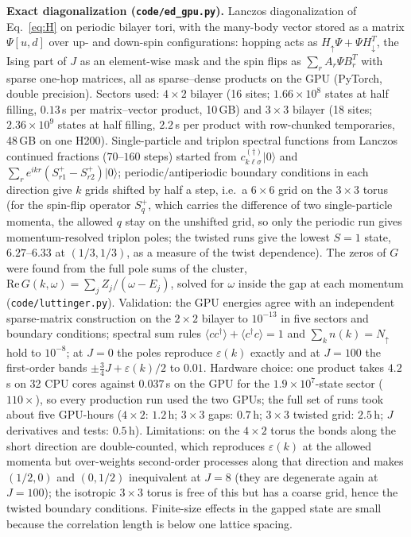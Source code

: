 \documentclass[11pt]{article}
\begin{document}
\textbf{Exact diagonalization (\texttt{code/ed\_gpu.py}).} Lanczos diagonalization of Eq.~\eqref{eq:H} on periodic bilayer tori, with the many-body vector stored as a matrix $\Psi[u,d]$ over up- and down-spin configurations: hopping acts as $H_\uparrow\Psi+\Psi H_\downarrow^{T}$, the Ising part of $J$ as an element-wise mask and the spin flips as $\sum_r A_r\Psi B_r^{T}$ with sparse one-hop matrices, all as sparse--dense products on the GPU (PyTorch, double precision). Sectors used: $4\times2$ bilayer (16 sites; $1.66\times10^8$ states at half filling, $0.13$\,s per matrix--vector product, 10\,GB) and $3\times3$ bilayer (18 sites; $2.36\times10^9$ states at half filling, $2.2$\,s per product with row-chunked temporaries, 48\,GB on one H200). Single-particle and triplon spectral functions from Lanczos continued fractions ($70$--$160$ steps) started from $c^{(\dagger)}_{k\ell\sigma}|0\rangle$ and $\sum_r e^{ikr}(S^+_{r1}-S^+_{r2})|0\rangle$; periodic/antiperiodic boundary conditions in each direction give $k$ grids shifted by half a step, i.e.\ a $6\times6$ grid on the $3\times3$ torus (for the spin-flip operator $S^+_q$, which carries the difference of two single-particle momenta, the allowed $q$ stay on the unshifted grid, so only the periodic run gives momentum-resolved triplon poles; the twisted runs give the lowest $S=1$ state, $6.27$--$6.33$ at $(1/3,1/3)$, as a measure of the twist dependence). The zeros of $G$ were found from the full pole sums of the cluster, $\mathrm{Re}\,G(k,\omega)=\sum_jZ_j/(\omega-E_j)$, solved for $\omega$ inside the gap at each momentum (\texttt{code/luttinger.py}). Validation: the GPU energies agree with an independent sparse-matrix construction on the $2\times2$ bilayer to $10^{-13}$ in five sectors and boundary conditions; spectral sum rules $\langle cc^\dagger\rangle+\langle c^\dagger c\rangle=1$ and $\sum_k n(k)=N_\uparrow$ hold to $10^{-8}$; at $J=0$ the poles reproduce $\varepsilon(k)$ exactly and at $J=100$ the first-order bands $\pm\tfrac34J+\varepsilon(k)/2$ to $0.01$. Hardware choice: one product takes $4.2$\,s on 32 CPU cores against $0.037$\,s on the GPU for the $1.9\times10^7$-state sector ($110\times$), so every production run used the two GPUs; the full set of runs took about five GPU-hours ($4\times2$: $1.2$\,h; $3\times3$ gaps: $0.7$\,h; $3\times3$ twisted grid: $2.5$\,h; $J$ derivatives and tests: $0.5$\,h). Limitations: on the $4\times2$ torus the bonds along the short direction are double-counted, which reproduces $\varepsilon(k)$ at the allowed momenta but over-weights second-order processes along that direction and makes $(1/2,0)$ and $(0,1/2)$ inequivalent at $J=8$ (they are degenerate again at $J=100$); the isotropic $3\times3$ torus is free of this but has a coarse grid, hence the twisted boundary conditions. Finite-size effects in the gapped state are small because the correlation length is below one lattice spacing.
\end{document}
